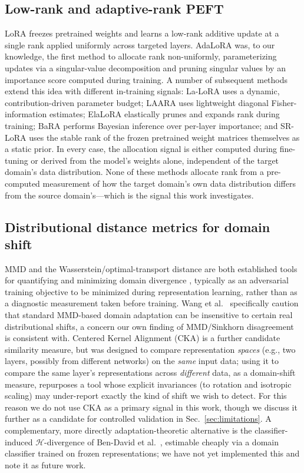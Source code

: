 \documentclass[conference]{IEEEtran}
\begin{document}
\subsection{Low-rank and adaptive-rank PEFT}
LoRA \cite{hu2021lora} freezes pretrained weights and learns a low-rank additive update at a single rank applied uniformly across targeted layers. AdaLoRA \cite{zhang2023adalora} was, to our knowledge, the first method to allocate rank non-uniformly, parameterizing updates via a singular-value decomposition and pruning singular values by an importance score computed during training. A number of subsequent methods extend this idea with different in-training signals: La-LoRA \cite{gu2025lalora} uses a dynamic, contribution-driven parameter budget; LAARA \cite{tripathi2026laara} uses lightweight diagonal Fisher-information estimates; ElaLoRA \cite{chang2025elalora} elastically prunes and expands rank during training; BaRA \cite{duan2026bara} performs Bayesian inference over per-layer importance; and SR-LoRA \cite{zhang2025srlora} uses the stable rank of the frozen pretrained weight matrices themselves as a static prior. In every case, the allocation signal is either computed during fine-tuning or derived from the model's weights alone, independent of the target domain's data distribution. None of these methods allocate rank from a pre-computed measurement of how the target domain's own data distribution differs from the source domain's---which is the signal this work investigates.

\subsection{Distributional distance metrics for domain shift}
MMD and the Wasserstein/optimal-transport distance are both established tools for quantifying and minimizing domain divergence \cite{shen2017wasserstein,su2019wasserstein}, typically as an adversarial training objective to be minimized during representation learning, rather than as a diagnostic measurement taken before training. Wang et al.\ \cite{wang2020rethinkmmd} specifically caution that standard MMD-based domain adaptation can be insensitive to certain real distributional shifts, a concern our own finding of MMD/Sinkhorn disagreement is consistent with. Centered Kernel Alignment (CKA) \cite{kornblith2019cka} is a further candidate similarity measure, but was designed to compare representation \emph{spaces} (e.g., two layers, possibly from different networks) on the \emph{same} input data; using it to compare the same layer's representations across \emph{different} data, as a domain-shift measure, repurposes a tool whose explicit invariances (to rotation and isotropic scaling) may under-report exactly the kind of shift we wish to detect. For this reason we do not use CKA as a primary signal in this work, though we discuss it further as a candidate for controlled validation in Sec.~\ref{sec:limitations}. A complementary, more directly adaptation-theoretic alternative is the classifier-induced $\mathcal{H}$-divergence of Ben-David et al.\ \cite{bendavid2010theory}, estimable cheaply via a domain classifier trained on frozen representations; we have not yet implemented this and note it as future work.
\end{document}
